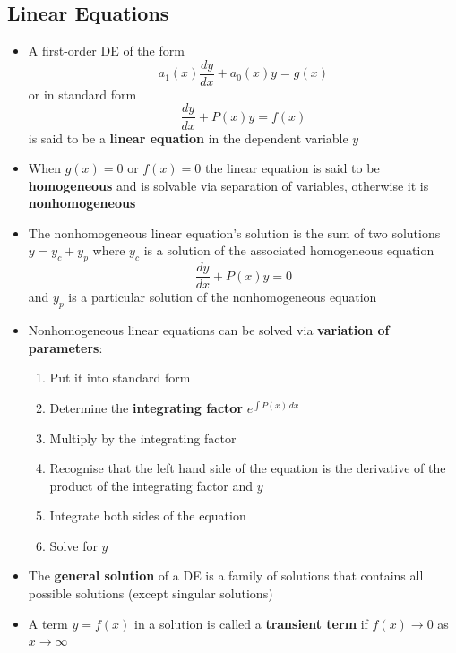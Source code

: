 \documentclass{article}
\begin{document}
\subsection{Linear Equations}

\begin{itemize}
  \item A first-order DE of the form \[a_1(x) \frac{d y}{d x} + a_0(x) y = g(x)\] or in standard form \[\frac{d y}{d x} + P(x) y = f(x)\] is said to be a \textbf{linear equation} in the dependent variable $y$

  \item When $g(x) = 0$ or $f(x) = 0$ the linear equation is said to be \textbf{homogeneous} and is solvable via separation of variables, otherwise it is \textbf{nonhomogeneous}

  \item The nonhomogeneous linear equation's solution is the sum of two solutions $y = y_c + y_p$ where $y_c$ is a solution of the associated homogeneous equation \[\frac{d y}{d x} + P(x) y = 0\] and $y_p$ is a particular solution of the nonhomogeneous equation

  \item Nonhomogeneous linear equations can be solved via \textbf{variation of parameters}:

        \begin{enumerate}
          \item Put it into standard form

          \item Determine the \textbf{integrating factor} $e^{\int P(x) \,d x}$

          \item Multiply by the integrating factor

          \item Recognise that the left hand side of the equation is the derivative of the product of the integrating factor and $y$

          \item Integrate both sides of the equation

          \item Solve for $y$
        \end{enumerate}

  \item The \textbf{general solution} of a DE is a family of solutions that contains all possible solutions (except singular solutions)

  \item A term $y = f(x)$ in a solution is called a \textbf{transient term} if $f(x) \rightarrow 0$ as $x \rightarrow \infty$


\end{itemize}
\end{document}
